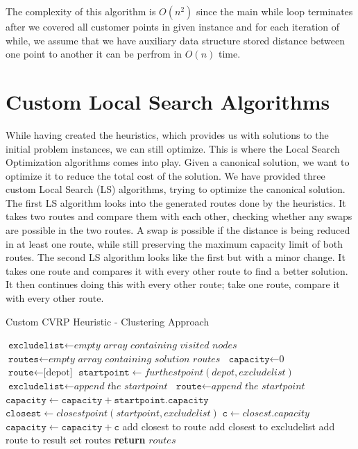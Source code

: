 \documentclass[12pt]{article}
\newcommand{\var}{\texttt}
\begin{document}
The complexity of this algorithm is $O(n^2)$ since the main while loop terminates after we covered all customer points in given instance and for each iteration of while, we assume that we have auxiliary data structure stored distance between one point to another it can be perfrom in $O(n)$ time.


\section{Custom Local Search Algorithms}
While having created the heuristics, which provides us with solutions to the initial problem instances, we can still optimize. This is where the Local Search Optimization algorithms comes into play. 
Given a canonical solution, we want to optimize it to reduce the total cost of the solution. We have provided three custom Local Search (LS) algorithms, trying to optimize the canonical solution. 
\newline
The first LS algorithm looks into the generated routes done by the heuristics. It takes two routes and compare them with each other, checking whether any swaps are possible in the two routes. 
A swap is possible if the distance is being reduced in at least one route, while still preserving the maximum capacity limit of both routes. 
The second LS algorithm looks like the first but with a minor change. It takes one route and compares it with every other route to find a better solution. It then continues doing this 
with every other route; take one route, compare it with every other route. 

\begin{algorithm}[!ht]
	\caption{Custom CVRP Heuristic - Clustering Approach}
	\begin{algorithmic}[1]
	\State $\var{excludelist} \gets \textit{empty array containing visited nodes}$
	\State $\var{routes} \gets \textit{empty array containing solution routes}$
	\State $\var{capacity} \gets \text{0}$
	\State $\var{route} \gets \text{[depot]}$
	\State $\var{startpoint} \gets furthestpoint(depot, excludelist)$
	\State $\var{excludelist} \gets \textit{append the startpoint}$
	\State $\var{route} \gets \textit{append the startpoint}$
	\State $\var{capacity} \gets \var{capacity} + \var{startpoint.capacity}$
			\State $\var{closest} \gets closestpoint(startpoint, excludelist)$
			\State $\var{c} \gets closest.capacity$
			\If{$\var{c} + \var{capacity} > \var{max capacity}$}
			\EndIf
			\State $\var{capacity} \gets \var{capacity} + \var{c}$
			\State add closest to route
			\State add closest to excludelist
		\EndWhile
		\State add route to result set routes
	\EndWhile
	\State \textbf{return} $routes$
	\EndFunction
	\end{algorithmic}
\end{algorithm}
\end{document}
